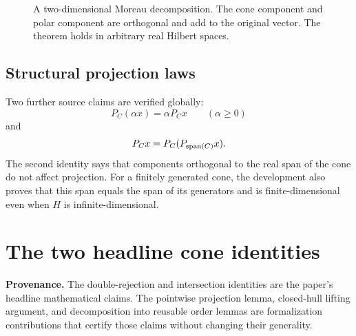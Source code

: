 \documentclass[11pt,a4paper]{article}
\begin{document}
\begin{figure}[htbp]
\centering
{}
\caption{A two-dimensional Moreau decomposition. The cone component and
polar component are orthogonal and add to the original vector. The theorem
holds in arbitrary real Hilbert spaces.}
\label{fig:moreau}
\end{figure}

\subsection{Structural projection laws}

Two further source claims are verified globally:
\[
  P_C(\alpha x)=\alpha P_Cx
  \qquad(\alpha\geq0)
\]
and
\[
  P_Cx=P_C(P_{\operatorname{span}(C)}x).
\]
The second identity says that components orthogonal to the real span of the
cone do not affect projection. For a finitely generated cone, the development
also proves that this span equals the span of its generators and is
finite-dimensional even when \(H\) is infinite-dimensional.

\section{The two headline cone identities}
\label{sec:headline}

\textbf{Provenance.} The double-rejection and intersection identities are the
paper's headline mathematical claims. The pointwise projection lemma,
closed-hull lifting argument, and decomposition into reusable order lemmas are
formalization contributions that certify those claims without changing their
generality.
\end{document}
